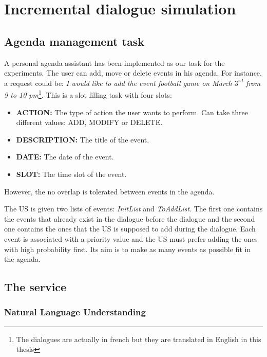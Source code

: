 \chapter{Incremental dialogue simulation}
\label{ch:simulation}

\section{Agenda management task}

	A personal agenda assistant has been implemented as our task for the experiments. The user can add, move or delete events in his agenda. For instance, a request could be: \textit{I would like to add the event football game on March $3^{rd}$ from 9 to 10 pm}\footnote{The dialogues are actually in french but they are translated in English in this thesis}. This is a slot filling task with four slots:
    
    \begin{itemize}
    	\item \textbf{ACTION:} The type of action the user wants to perform. Can take three different values: ADD, MODIFY or DELETE.
        \item \textbf{DESCRIPTION:} The title of the event.
        \item \textbf{DATE:} The date of the event.
        \item \textbf{SLOT:} The time slot of the event.
    \end{itemize}
    
    However, the no overlap is tolerated between events in the agenda.
    
    The US is given two lists of events: \textit{InitList} and \textit{ToAddList}. The first one contains the events that already exist in the dialogue before the dialogue and the second one contains the ones that the US is supposed to add during the dialogue. Each event is associated with a priority value and the US must prefer adding the ones with high probability first. Its aim is to make as many events as possible fit in the agenda.
		
		\section{The service}
		
			\subsection{Natural Language Understanding}
			
